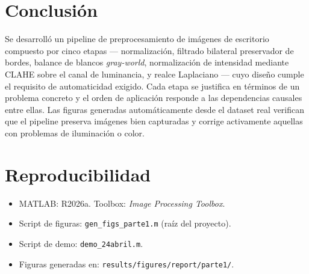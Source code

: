 \documentclass[11pt,a4paper]{article}
\begin{document}
\section{Conclusión}

Se desarrolló un pipeline de preprocesamiento de imágenes de escritorio compuesto
por cinco etapas — normalización, filtrado bilateral preservador de bordes,
balance de blancos \emph{gray-world}, normalización de intensidad mediante CLAHE
sobre el canal de luminancia, y realce Laplaciano — cuyo diseño cumple el requisito
de automaticidad exigido. Cada etapa se justifica en términos de un problema concreto
y el orden de aplicación responde a las dependencias causales entre ellas. Las
figuras generadas automáticamente desde el dataset real verifican que el pipeline
preserva imágenes bien capturadas y corrige activamente aquellas con problemas de
iluminación o color.

\appendix
\section{Reproducibilidad}

\begin{itemize}
    \item MATLAB: R2026a. Toolbox: \textit{Image Processing Toolbox}.
    \item Script de figuras: \texttt{gen\_figs\_parte1.m} (raíz del proyecto).
    \item Script de demo: \texttt{demo\_24abril.m}.
    \item Figuras generadas en: \texttt{results/figures/report/parte1/}.
\end{itemize}
\end{document}
